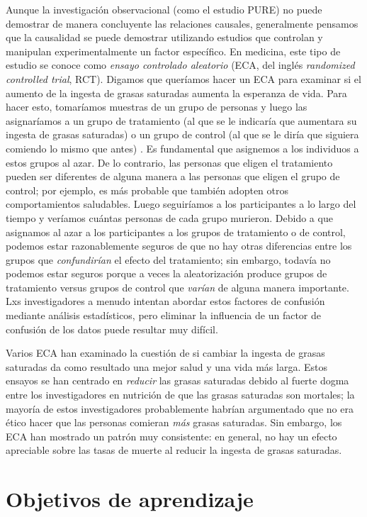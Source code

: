 \documentclass[
  12pt,
]{book}
\theoremstyle{definition}
\theoremstyle{definition}
\theoremstyle{definition}
\theoremstyle{remark}
\begin{document}
Aunque la investigación observacional (como el estudio PURE) no puede demostrar de manera concluyente las relaciones causales, generalmente pensamos que la causalidad se puede demostrar utilizando estudios que controlan y manipulan experimentalmente un factor específico. En medicina, este tipo de estudio se conoce como \emph{ensayo controlado aleatorio} (ECA, del inglés \emph{randomized controlled trial}, RCT). Digamos que queríamos hacer un ECA para examinar si el aumento de la ingesta de grasas saturadas aumenta la esperanza de vida. Para hacer esto, tomaríamos muestras de un grupo de personas y luego las asignaríamos a un grupo de tratamiento (al que se le indicaría que aumentara su ingesta de grasas saturadas) o un grupo de control (al que se le diría que siguiera comiendo lo mismo que antes) . Es fundamental que asignemos a los individuos a estos grupos al azar. De lo contrario, las personas que eligen el tratamiento pueden ser diferentes de alguna manera a las personas que eligen el grupo de control; por ejemplo, es más probable que también adopten otros comportamientos saludables. Luego seguiríamos a los participantes a lo largo del tiempo y veríamos cuántas personas de cada grupo murieron. Debido a que asignamos al azar a los participantes a los grupos de tratamiento o de control, podemos estar razonablemente seguros de que no hay otras diferencias entre los grupos que \emph{confundirían} el efecto del tratamiento; sin embargo, todavía no podemos estar seguros porque a veces la aleatorización produce grupos de tratamiento versus grupos de control que \emph{varían} de alguna manera importante. Lxs investigadores a menudo intentan abordar estos factores de confusión mediante análisis estadísticos, pero eliminar la influencia de un factor de confusión de los datos puede resultar muy difícil.

Varios ECA han examinado la cuestión de si cambiar la ingesta de grasas saturadas da como resultado una mejor salud y una vida más larga. Estos ensayos se han centrado en \emph{reducir} las grasas saturadas debido al fuerte dogma entre los investigadores en nutrición de que las grasas saturadas son mortales; la mayoría de estos investigadores probablemente habrían argumentado que no era ético hacer que las personas comieran \emph{más} grasas saturadas. Sin embargo, los ECA han mostrado un patrón muy consistente: en general, no hay un efecto apreciable sobre las tasas de muerte al reducir la ingesta de grasas saturadas.

\hypertarget{objetivos-de-aprendizaje}{%
\section{Objetivos de aprendizaje}\label{objetivos-de-aprendizaje}}
\end{document}
